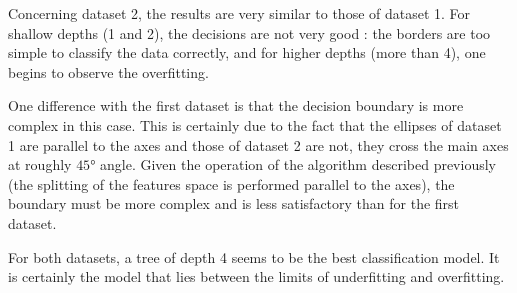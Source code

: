 Concerning dataset 2, the results are very similar to those of dataset 1. For shallow depths (1 and 2), the decisions are not very good : the borders are too simple to classify the data correctly, and for higher depths (more than 4), one begins to observe the overfitting.\par
One difference with the first dataset is that the decision boundary is more complex in this case. This is certainly due to the fact that the ellipses of dataset 1 are parallel to the axes and those of dataset 2 are not, they cross the main axes at roughly $45°$ angle. Given the operation of the algorithm described previously (the splitting of the features space is performed parallel to the axes), the boundary must be more complex and is less satisfactory than for the first dataset.\par
For both datasets, a tree of depth 4 seems to be the best classification model. It is certainly the model that lies between the limits of underfitting and overfitting.

